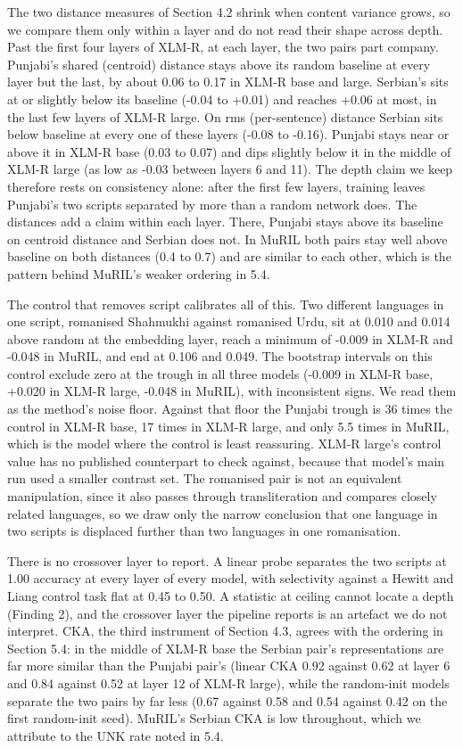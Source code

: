 The two distance measures of Section 4.2 shrink when content variance
grows, so we compare them only within a layer and do not read their
shape across depth. Past the first four layers of XLM-R, at each layer,
the two pairs part company. Punjabi's shared (centroid) distance stays
above its random baseline at every layer but the last, by about 0.06 to
0.17 in XLM-R base and large. Serbian's sits at or slightly below its
baseline (-0.04 to +0.01) and reaches +0.06 at most, in the last few
layers of XLM-R large. On rms (per-sentence) distance Serbian sits below
baseline at every one of these layers (-0.08 to -0.16). Punjabi stays
near or above it in XLM-R base (0.03 to 0.07) and dips slightly below it
in the middle of XLM-R large (as low as -0.03 between layers 6 and 11).
The depth claim we keep therefore rests on consistency alone: after the
first few layers, training leaves Punjabi's two scripts separated by
more than a random network does. The distances add a claim within each
layer. There, Punjabi stays above its baseline on centroid distance and
Serbian does not. In MuRIL both pairs stay well above baseline on both
distances (0.4 to 0.7) and are similar to each other, which is the
pattern behind MuRIL's weaker ordering in 5.4.

The control that removes script calibrates all of this. Two different
languages in one script, romanised Shahmukhi against romanised Urdu, sit
at 0.010 and 0.014 above random at the embedding layer, reach a minimum
of -0.009 in XLM-R and -0.048 in MuRIL, and end at 0.106 and 0.049. The
bootstrap intervals on this control exclude zero at the trough in all
three models (-0.009 in XLM-R base, +0.020 in XLM-R large, -0.048 in
MuRIL), with inconsistent signs. We read them as the method's noise
floor. Against that floor the Punjabi trough is 36 times the control in
XLM-R base, 17 times in XLM-R large, and only 5.5 times in MuRIL, which
is the model where the control is least reassuring. XLM-R large's
control value has no published counterpart to check against, because
that model's main run used a smaller contrast set. The romanised pair is
not an equivalent manipulation, since it also passes through
transliteration and compares closely related languages, so we draw only
the narrow conclusion that one language in two scripts is displaced
further than two languages in one romanisation.

There is no crossover layer to report. A linear probe separates the two
scripts at 1.00 accuracy at every layer of every model, with selectivity
against a Hewitt and Liang control task flat at 0.45 to 0.50. A
statistic at ceiling cannot locate a depth (Finding 2), and the
crossover layer the pipeline reports is an artefact we do not interpret.
CKA, the third instrument of Section 4.3, agrees with the ordering in
Section 5.4: in the middle of XLM-R base the Serbian pair's
representations are far more similar than the Punjabi pair's (linear CKA
0.92 against 0.62 at layer 6 and 0.84 against 0.52 at layer 12 of XLM-R
large), while the random-init models separate the two pairs by far less
(0.67 against 0.58 and 0.54 against 0.42 on the first random-init seed).
MuRIL's Serbian CKA is low throughout, which we attribute to the UNK
rate noted in 5.4.

